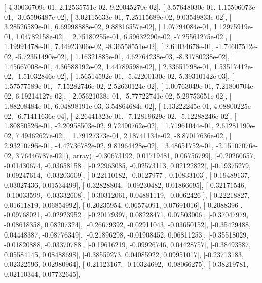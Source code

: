 \documentclass{article}
\begin{document}
       [  4.30036709e-01,   2.12535751e-02,   9.20045270e-02],
       [  3.57648030e-01,   1.15506073e-01,  -3.05596487e-02],
       [  3.02115633e-01,   7.25115689e-02,   9.03549833e-02],
       [  3.28526589e-01,   6.69998888e-02,   9.88816557e-02],
       [  1.07794084e-01,   1.12975919e-01,   1.04782158e-02],
       [  2.75180255e-01,   6.59632290e-02,  -7.25561275e-02],
       [  1.19991478e-01,   7.44923306e-02,  -8.36558551e-02],
       [  2.61034678e-01,  -1.74607512e-02,  -5.72351490e-02],
       [  1.16321885e-01,   4.62764238e-03,  -8.31780238e-02],
       [  1.45667008e-01,   4.36588192e-02,   1.44789598e-02],
       [  2.33651798e-01,   1.53517412e-02,  -1.51032846e-02],
       [  1.56514592e-01,  -5.42200130e-02,   5.39310142e-03],
       [  1.57577589e-01,  -7.15282746e-02,   2.52630124e-02],
       [  1.00763049e-01,   7.21800704e-02,   6.19214127e-02],
       [  2.05621038e-01,  -5.77722741e-02,   5.29753651e-02],
       [  1.88208484e-01,   6.04898191e-03,   3.54864684e-02],
       [  1.13222245e-01,   4.08800225e-02,  -6.71411636e-04],
       [  2.26441323e-01,  -7.12819629e-02,  -5.12288246e-02],
       [  1.80850526e-01,  -2.20958503e-02,   9.72490762e-02],
       [  1.71961044e-01,   2.61281190e-02,   7.49462627e-02],
       [  1.79127373e-01,   2.18741134e-02,  -8.87017636e-02],
       [  2.93210796e-01,  -4.42736782e-02,   9.81964428e-02],
       [  3.48651752e-01,  -2.15107076e-02,   3.76446787e-02]]), array([[-0.30673192,  0.01719481,  0.06756799],
       [-0.20260657, -0.01430674, -0.03658158],
       [-0.22963085, -0.02573113,  0.02122822],
       [-0.19375279, -0.09247614, -0.03203609],
       [-0.22110182, -0.0127977 ,  0.10833103],
       [-0.19489137,  0.03027436,  0.01534499],
       [-0.32828804, -0.09230482,  0.01866695],
       [-0.32171546, -0.10033599, -0.03332608],
       [-0.30312061,  0.04881119, -0.0062426 ],
       [-0.22218827,  0.01611819,  0.06854992],
       [-0.20235954,  0.06574091,  0.07691016],
       [-0.2088396 , -0.09768021, -0.02923952],
       [-0.20179397,  0.08228471,  0.07503006],
       [-0.37047979, -0.08618358,  0.08207324],
       [-0.26679392, -0.02911043, -0.03650152],
       [-0.35429488,  0.04448387, -0.08776349],
       [-0.21896298, -0.01908452,  0.06811253],
       [-0.35518029, -0.01820888, -0.03370788],
       [-0.19616219, -0.09926746,  0.04428757],
       [-0.38493587,  0.05584145,  0.08488698],
       [-0.38559273,  0.04085922,  0.09951017],
       [-0.23713183,  0.02322596,  0.02980964],
       [-0.21123167, -0.10324692, -0.08066275],
       [-0.38219781,  0.02110344,  0.07732645],
\end{document}
